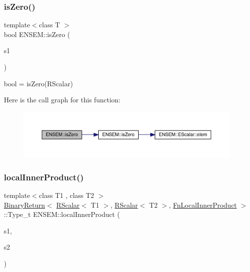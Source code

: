 \subsubsection{\texorpdfstring{isZero()}{isZero()}}
{\footnotesize\ttfamily template$<$class T $>$ \\
bool E\+N\+S\+E\+M\+::is\+Zero (\begin{DoxyParamCaption}\item[{const \mbox{\hyperlink{classENSEM_1_1RScalar}{R\+Scalar}}$<$ T $>$ \&}]{s1 }\end{DoxyParamCaption})}



bool = is\+Zero(\+R\+Scalar) 

Here is the call graph for this function\+:\nopagebreak
\begin{figure}[H]
\begin{center}
\leavevmode
\includegraphics[width=350pt]{d9/ded/group__rscalar_gad963fef363cb9cc2ca365a068821a5ff_cgraph}
\end{center}
\end{figure}
\mbox{\label{group__rscalar_gadd76bb3801e8a4665498325bf9c7f6ae}} 
\subsubsection{\texorpdfstring{localInnerProduct()}{localInnerProduct()}}
{\footnotesize\ttfamily template$<$class T1 , class T2 $>$ \\
\mbox{\hyperlink{structENSEM_1_1BinaryReturn}{Binary\+Return}}$<$ \mbox{\hyperlink{classENSEM_1_1RScalar}{R\+Scalar}}$<$ T1 $>$, \mbox{\hyperlink{classENSEM_1_1RScalar}{R\+Scalar}}$<$ T2 $>$, \mbox{\hyperlink{structENSEM_1_1FnLocalInnerProduct}{Fn\+Local\+Inner\+Product}} $>$\+::Type\+\_\+t E\+N\+S\+E\+M\+::local\+Inner\+Product (\begin{DoxyParamCaption}\item[{const \mbox{\hyperlink{classENSEM_1_1RScalar}{R\+Scalar}}$<$ T1 $>$ \&}]{s1,  }\item[{const \mbox{\hyperlink{classENSEM_1_1RScalar}{R\+Scalar}}$<$ T2 $>$ \&}]{s2 }\end{DoxyParamCaption})\hspace{0.3cm}{\ttfamily [inline]}}

